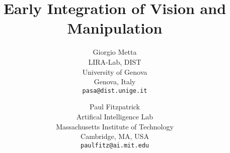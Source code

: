 \documentclass[]{article}
\begin{document}
 

\onecolumn



\title{Early Integration of Vision and Manipulation}

\author{
Giorgio Metta\\
LIRA-Lab, DIST\\
University of Genova\\
Genova, Italy\\
{\tt pasa@dist.unige.it}
\and 
Paul Fitzpatrick\\
Artifical Intelligence Lab\\
Massachusetts Institute of Technology\\
Cambridge, MA, USA\\
{\tt paulfitz@ai.mit.edu}
}






\maketitle

\ifdraft
  \thispagestyle{plain}
  \pagestyle{plain}
\fi


\end{document}
